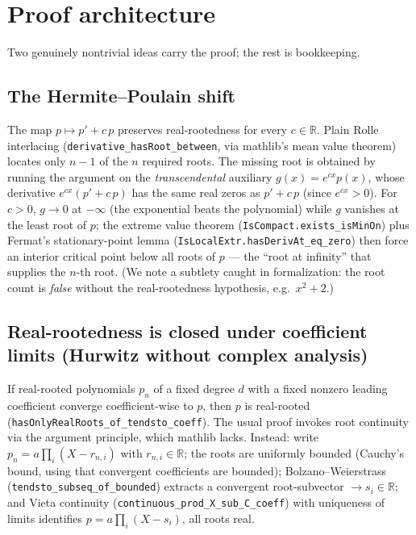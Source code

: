 \documentclass[11pt]{article}
\theoremstyle{definition}
\theoremstyle{remark}
\newcommand{\R}{\mathbb{R}}
\begin{document}
\section{Proof architecture}\label{sec:proof}

Two genuinely nontrivial ideas carry the proof; the rest is bookkeeping.

\subsection{The Hermite--Poulain shift}
The map $p \mapsto p' + c\,p$ preserves real-rootedness for every $c \in \R$. Plain Rolle
interlacing (\texttt{derivative\_hasRoot\_between}, via mathlib's mean value theorem) locates only
$n-1$ of the $n$ required roots. The missing root is obtained by running the argument on the
\emph{transcendental} auxiliary $g(x) = e^{cx}p(x)$, whose derivative $e^{cx}(p'+c\,p)$ has the same
real zeros as $p'+c\,p$ (since $e^{cx}>0$). For $c>0$, $g \to 0$ at $-\infty$ (the exponential beats
the polynomial) while $g$ vanishes at the least root of $p$; the extreme value theorem
(\texttt{IsCompact.exists\_isMinOn}) plus Fermat's stationary-point lemma
(\texttt{IsLocalExtr.hasDerivAt\_eq\_zero}) then force an interior critical point below all roots of
$p$ --- the ``root at infinity'' that supplies the $n$-th root. (We note a subtlety caught in
formalization: the root count is \emph{false} without the real-rootedness hypothesis, e.g.\ $x^2+2$.)

\subsection{Real-rootedness is closed under coefficient limits (Hurwitz without complex analysis)}
If real-rooted polynomials $p_n$ of a fixed degree $d$ with a fixed nonzero leading coefficient
converge coefficient-wise to $p$, then $p$ is real-rooted (\texttt{hasOnlyRealRoots\_of\_tendsto\_coeff}).
The usual proof invokes root continuity via the argument principle, which mathlib lacks. Instead:
write $p_n = a\prod_i (X - r_{n,i})$ with $r_{n,i}\in\R$; the roots are uniformly bounded (Cauchy's
bound, using that convergent coefficients are bounded); Bolzano--Weierstrass
(\texttt{tendsto\_subseq\_of\_bounded}) extracts a convergent root-subvector $\to s_i \in \R$; and
Vieta continuity (\texttt{continuous\_prod\_X\_sub\_C\_coeff}) with uniqueness of limits identifies
$p = a\prod_i(X-s_i)$, all roots real.
\end{document}
